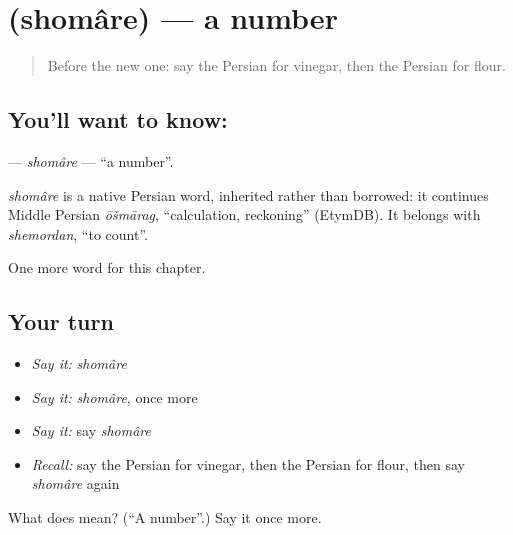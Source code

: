 \section[\texorpdfstring{\fa{شماره} (shomâre)}{شماره (shomâre)}]{ (shomâre) — a number}

\label{lesson:FA-C276-shomare}



\begin{quote}
Before the new one: say the Persian for vinegar, then the Persian for flour.
\end{quote}

\subsection*{You'll want to know: }
\textbf{} — \emph{shomâre} — \textquotedblleft{}a number\textquotedblright{}.

\begin{cousinweb}
\emph{shomâre} is a native Persian word, inherited rather than borrowed: it continues Middle Persian \emph{ōšmārag}, \textquotedblleft{}calculation, reckoning\textquotedblright{} (EtymDB). It belongs with \emph{shemordan}, \textquotedblleft{}to count\textquotedblright{}.
\end{cousinweb}

\begin{grammarlens}[title={What you've built}]
One more word for this chapter.
\end{grammarlens}

\subsection*{Your turn}
\begin{itemize}
\raggedright
  \item \emph{Say it:} \emph{shomâre}
  \item \emph{Say it:} \emph{shomâre}, once more
  \item \emph{Say it:} say \emph{shomâre}
  \item \emph{Recall:} say the Persian for vinegar, then the Persian for flour, then say \emph{shomâre} again
\end{itemize}

\begin{tcolorbox}[breakable,colback=teal!4,colframe=teal!35!black,title={Before you move on}]
What does  mean? (\textquotedblleft{}A number\textquotedblright{}.) Say it once more.
\end{tcolorbox}

